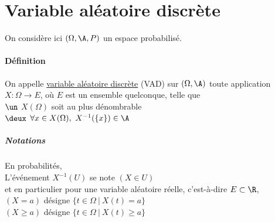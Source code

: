 

\minitoc
	\section{Variable aléatoire discrète}
		On considère ici $(\Omega,\A,P)$ un espace probabilisé.
		\traitd
		\paragraph{Définition}
			On appelle \uline{variable aléatoire discrète} (VAD) sur $(\Omega,\A)$ toute application $X:\Omega \to E$, où $E$ est un ensemble quelconque, telle que\\
			\hspace*{2.5cm} $\un$ $X(\Omega)$ soit au plus dénombrable\\
			\hspace*{2.5cm} $\deux$ $\forall x\in X(\Omega) ,~ X^{-1}(\{x\}) \in \A$ 
		\trait
		\\
		\subparagraph{Notations} En probabilités, \\
			\hspace*{2.5cm} L'événement $X^{-1}(U)$ se note $(X\in U)$\\
			et en particulier pour une variable aléatoire réelle, c'est-à-dire $E\subset \R$,\\
			\hspace*{2.5cm} $(X=a)$ désigne $\{t\in \Omega ~\vert ~ X(t)=a \}$\\
			\hspace*{2.5cm} $(X\geqslant a)$ désigne $\{t\in\Omega ~\vert ~ X(t) \geqslant a\}$
		\vspace*{0.5cm} \\
		\vspace*{0.5cm} \\ 
